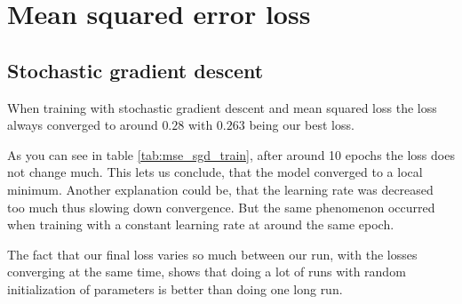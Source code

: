 \section{Mean squared error loss}
\subsection{Stochastic gradient descent}
When training with stochastic gradient descent and mean 
squared loss the loss always converged to around $0.28$ 
with $0.263$ being our best loss.

As you can see in table \ref*{tab:mse_sgd_train}, after around 10 epochs 
the loss does not change much.
This lets us conclude, that the model converged to a local minimum. Another explanation
could be, that the learning rate was decreased too much thus slowing down convergence. 
But the same phenomenon occurred when training with a constant learning rate at around 
the same epoch.

The fact that our final loss varies so much between our run, with the losses 
converging at the same time, shows that doing a lot of runs with random 
initialization of parameters is better than doing one long run.


